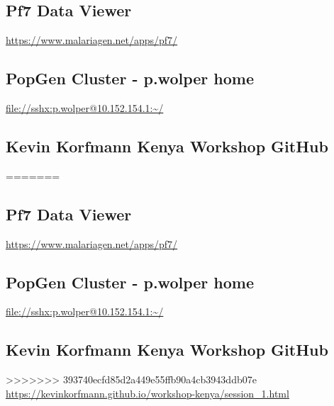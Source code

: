 \documentclass[11pt]{article}
\begin{document}
\subsection{Pf7 Data Viewer}
\label{sec:orge2ae74a}
\url{https://www.malariagen.net/apps/pf7/}

\subsection{PopGen Cluster - p.wolper home}
\label{sec:orgfb8c444}
\url{file://sshx:p.wolper@10.152.154.1:\~/}

\subsection{Kevin Korfmann Kenya Workshop GitHub}
\label{sec:org7c0bec0}
=======
\label{sec:org145450a}
\subsection{Pf7 Data Viewer}
\label{sec:orgf166341}
\url{https://www.malariagen.net/apps/pf7/}

\subsection{PopGen Cluster - p.wolper home}
\label{sec:orgacbe780}
\url{file://sshx:p.wolper@10.152.154.1:\~/}

\subsection{Kevin Korfmann Kenya Workshop GitHub}
\label{sec:orgacdc2d8}
>>>>>>> 393740ecfd85d2a449e55ffb90a4cb3943ddb07e
\url{https://kevinkorfmann.github.io/workshop-kenya/session\_1.html}
\end{document}
